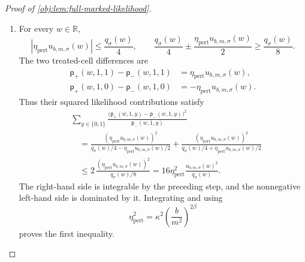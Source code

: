 \begin{proof}[Proof of \cref{obj:lem:full-marked-likelihood}]
\begin{enumerate}
\item For every \(w\in\mathbb R\),
\[
|\eta_{\mathrm{pert}}u_{b,m,\sigma}(w)|
\le\frac{q_\sigma(w)}4,
\qquad
\frac{q_\sigma(w)}4
\pm\frac{\eta_{\mathrm{pert}}u_{b,m,\sigma}(w)}2
\ge\frac{q_\sigma(w)}8.
\]
The two treated-cell differences are
\[
\begin{aligned}
\mathsf p_+(w,1,1)-\mathsf p_-(w,1,1)
&=\eta_{\mathrm{pert}}u_{b,m,\sigma}(w),\\
\mathsf p_+(w,1,0)-\mathsf p_-(w,1,0)
&=-\eta_{\mathrm{pert}}u_{b,m,\sigma}(w).
\end{aligned}
\]
Thus their squared likelihood contributions satisfy
\[
\begin{aligned}
&\sum_{y\in\{0,1\}}
\frac{\bigl(\mathsf p_+(w,1,y)-\mathsf p_-(w,1,y)\bigr)^2}
     {\mathsf p_-(w,1,y)}\\
&\quad=
\frac{(\eta_{\mathrm{pert}}u_{b,m,\sigma}(w))^2}
     {q_\sigma(w)/4-\eta_{\mathrm{pert}}u_{b,m,\sigma}(w)/2}
+
\frac{(\eta_{\mathrm{pert}}u_{b,m,\sigma}(w))^2}
     {q_\sigma(w)/4+\eta_{\mathrm{pert}}u_{b,m,\sigma}(w)/2}\\
&\quad\le
2\,\frac{(\eta_{\mathrm{pert}}u_{b,m,\sigma}(w))^2}{q_\sigma(w)/8}
=
16\eta_{\mathrm{pert}}^2
\frac{u_{b,m,\sigma}(w)^2}{q_\sigma(w)}.
\end{aligned}
\]
The right-hand side is integrable by the preceding step, and the nonnegative left-hand side is dominated by it. Integrating and using
\[
\eta_{\mathrm{pert}}^2
=\kappa^2\left(\frac{b}{m^2}\right)^{2\beta}
\]
proves the first inequality.


\end{enumerate}
\end{proof}
